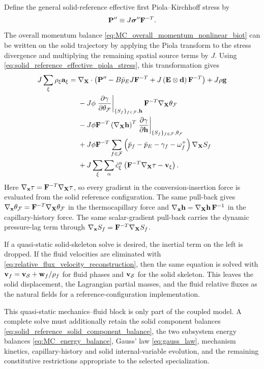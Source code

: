 Define the general solid-reference effective first Piola--Kirchhoff stress by
%
\begin{equation}
	\mathbf{P}^{\prime\prime}
	\equiv
	J\boldsymbol{\sigma}^{\prime\prime}\mathbf{F}^{-T}.
	\label{eq:solid_reference_effective_piola_stress}
\end{equation}
%
The overall momentum balance \eqref{eq:MC_overall_momentum_nonlinear_biot} can be
written on the solid trajectory by applying the Piola transform to the stress
divergence and multiplying the remaining spatial source terms by \(J\).  Using
\eqref{eq:solid_reference_effective_piola_stress}, this transformation gives
%
\begin{align}
	J\sum_\xi\rho_\xi\mathbf{a}_\xi
	= & \;
	\nabla_{\mathbf{X}}\cdot
		\left(
		\mathbf{P}^{\prime\prime}
		-B\bar p_E J \mathbf{F}^{-T}
		+J\left(\mathbf{E}\otimes\mathbf{d}\right)\mathbf{F}^{-T}
		\right)
	+J\rho\mathbf{g}
	\notag \\
	&\;
	-J\phi
	\left.
	\frac{\partial \gamma}{\partial \theta_{\mathcal{F}}}
	\right\vert_{\{S_f\}_{f\in\mathcal{F}},\mathbf{h}}
	\mathbf{F}^{-T}\nabla_{\mathbf{X}}\theta_{\mathcal{F}}
	\notag \\
	&\;
	-J\phi\mathbf{F}^{-T}
	\left(\nabla_{\mathbf{X}}\mathbf{h}\right)^T
	\left.
	\frac{\partial \gamma}{\partial \mathbf{h}}
	\right\vert_{\{S_f\}_{f\in\mathcal{F}},\theta_{\mathcal{F}}}
	\notag \\
	&\;
	+J\phi\mathbf{F}^{-T}
	\sum_{f\in\mathcal{F}}
	\left(
	\bar p_f-\bar p_E-\gamma_f-\omega_f^+
	\right)
	\nabla_{\mathbf{X}}S_f
	\notag \\
	&\;
	+J\sum_\xi\sum_\alpha\dot{c}_\xi^\alpha
	\left(
		\mathbf{F}^{-T}\nabla_{\mathbf{X}}\tau-\mathbf{v}_\xi
	\right).
	\label{eq:solid_reference_overall_momentum}
\end{align}
%
Here
\(\nabla_{\mathbf{x}}\tau=\mathbf{F}^{-T}\nabla_{\mathbf{X}}\tau\), so every gradient in
the conversion-insertion force is evaluated from the solid reference
configuration.  The same pull-back gives
\(\nabla_{\mathbf{x}}\theta_{\mathcal{F}}
=\mathbf{F}^{-T}\nabla_{\mathbf{X}}\theta_{\mathcal{F}}\) in the thermocapillary force and
\(\nabla_{\mathbf{x}}\mathbf{h}
=\nabla_{\mathbf{X}}\mathbf{h}\,\mathbf{F}^{-1}\) in the capillary-history force.
The same scalar-gradient pull-back carries the dynamic pressure-lag term through
\(\nabla_{\mathbf{x}}S_f=\mathbf{F}^{-T}\nabla_{\mathbf{X}}S_f\).

If a quasi-static solid-skeleton solve is desired, the inertial term on the left
is dropped.  If the fluid velocities are eliminated with
\eqref{eq:relative_flux_velocity_reconstruction}, then the same equation is
solved with $\mathbf{v}_f=\mathbf{v}_{\mathcal{S}}+\mathbf{w}_f/\rho_f$ for fluid phases and
$\mathbf{v}_{\mathcal{S}}$ for the solid skeleton.  This leaves the solid displacement, the
Lagrangian partial masses, and the fluid relative fluxes as the natural fields
for a reference-configuration implementation.

This quasi-static mechanics--fluid block is only part of the coupled model.
A complete solve must additionally retain the solid component balances
\eqref{eq:solid_reference_solid_component_balance}, the two subsystem energy
balances \eqref{eq:MC_energy_balance}, Gauss' law \eqref{eq:gauss_law},
mechanism kinetics, capillary-history and solid internal-variable evolution,
and the remaining constitutive restrictions appropriate to the selected
specialization.
